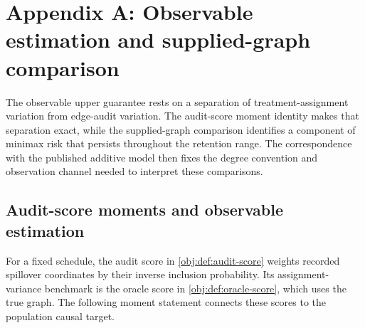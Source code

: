 \section{Appendix A: Observable estimation and supplied-graph comparison}

The observable upper guarantee rests on a separation of treatment-assignment variation from edge-audit variation. The audit-score moment identity makes that separation exact, while the supplied-graph comparison identifies a component of minimax risk that persists throughout the retention range. The correspondence with the published additive model then fixes the degree convention and observation channel needed to interpret these comparisons.

\subsection{Audit-score moments and observable estimation}

For a fixed schedule, the audit score in \cref{obj:def:audit-score} weights recorded spillover coordinates by their inverse inclusion probability. Its assignment-variance benchmark is the oracle score in \cref{obj:def:oracle-score}, which uses the true graph. The following moment statement connects these scores to the population causal target.

